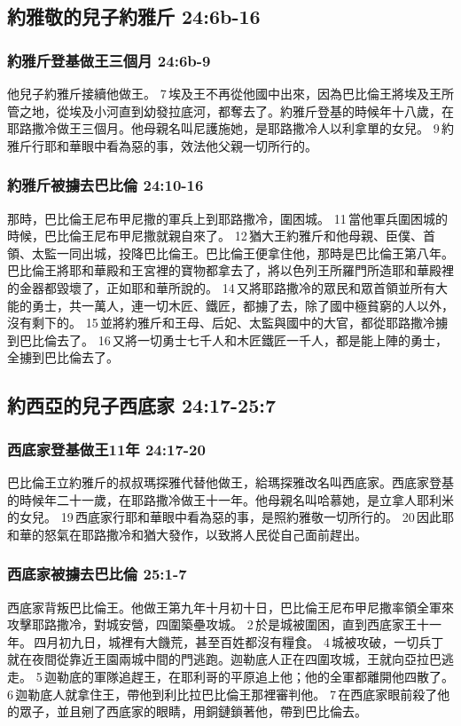 \subsection{約雅敬的兒子約雅斤 24:6b-16 }
\subsubsection{約雅斤登基做王三個月 24:6b-9}
他兒子約雅斤接續他做王。 7 埃及王不再從他國中出來，因為巴比倫王將埃及王所管之地，從埃及小河直到幼發拉底河，都奪去了。約雅斤登基的時候年十八歲，在耶路撒冷做王三個月。他母親名叫尼護施她，是耶路撒冷人以利拿單的女兒。 9 約雅斤行耶和華眼中看為惡的事，效法他父親一切所行的。

\subsubsection{約雅斤被擄去巴比倫 24:10-16 }
那時，巴比倫王尼布甲尼撒的軍兵上到耶路撒冷，圍困城。 11 當他軍兵圍困城的時候，巴比倫王尼布甲尼撒就親自來了。 12 猶大王約雅斤和他母親、臣僕、首領、太監一同出城，投降巴比倫王。巴比倫王便拿住他，那時是巴比倫王第八年。巴比倫王將耶和華殿和王宮裡的寶物都拿去了，將以色列王所羅門所造耶和華殿裡的金器都毀壞了，正如耶和華所說的。 14 又將耶路撒冷的眾民和眾首領並所有大能的勇士，共一萬人，連一切木匠、鐵匠，都擄了去，除了國中極貧窮的人以外，沒有剩下的。 15 並將約雅斤和王母、后妃、太監與國中的大官，都從耶路撒冷擄到巴比倫去了。 16 又將一切勇士七千人和木匠鐵匠一千人，都是能上陣的勇士，全擄到巴比倫去了。

\subsection{約西亞的兒子西底家 24:17-25:7 }
\subsubsection{西底家登基做王11年 24:17-20 }
巴比倫王立約雅斤的叔叔瑪探雅代替他做王，給瑪探雅改名叫西底家。西底家登基的時候年二十一歲，在耶路撒冷做王十一年。他母親名叫哈慕她，是立拿人耶利米的女兒。 19 西底家行耶和華眼中看為惡的事，是照約雅敬一切所行的。 20 因此耶和華的怒氣在耶路撒冷和猶大發作，以致將人民從自己面前趕出。

\subsubsection{西底家被擄去巴比倫 25:1-7 }
西底家背叛巴比倫王。他做王第九年十月初十日，巴比倫王尼布甲尼撒率領全軍來攻擊耶路撒冷，對城安營，四圍築壘攻城。 2 於是城被圍困，直到西底家王十一年。 四月初九日，城裡有大饑荒，甚至百姓都沒有糧食。 4 城被攻破，一切兵丁就在夜間從靠近王園兩城中間的門逃跑。迦勒底人正在四圍攻城，王就向亞拉巴逃走。 5 迦勒底的軍隊追趕王，在耶利哥的平原追上他；他的全軍都離開他四散了。 6 迦勒底人就拿住王，帶他到利比拉巴比倫王那裡審判他。 7 在西底家眼前殺了他的眾子，並且剜了西底家的眼睛，用銅鏈鎖著他，帶到巴比倫去。

